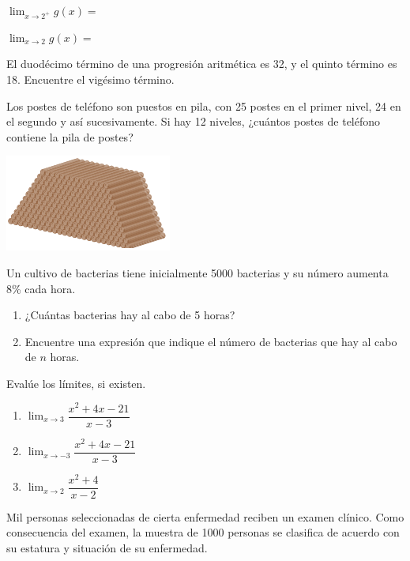 \documentclass[letterpaper,fleqn]{article}
\let\ds\displaystyle
\begin{document}
\begin{enumerate}
\begin{enumerate}
\begin{multicols}{2}
\item $\ds{\lim_{x\rightarrow 2^{+}}g(x)}=$
\item $\ds{\lim_{x\rightarrow 2}g(x)}=$
\end{multicols}
\end{enumerate}
\item El duodécimo término de una progresión aritmética es 32, y el quinto término es 18. Encuentre el vigésimo término.\noanswer
\begin{minipage}{.45\textwidth}
\item Los postes de teléfono son puestos en pila, con 25 postes en el primer nivel, 24 en el segundo y así sucesivamente. Si hay 12 niveles, ¿cuántos postes de teléfono contiene la pila de postes?
\end{minipage}\hfill
\begin{minipage}{.45\textwidth}
\includegraphics[scale=.9]{Images/postes.png} 
\end{minipage}
\noanswer
\item Un cultivo de bacterias tiene inicialmente 5000 bacterias y su número aumenta 8\% cada hora. 
\begin{enumerate}
\item ¿Cuántas bacterias hay al cabo de 5 horas?\noanswer
\item Encuentre una expresi\'{o}n que indique el n\'{u}mero de bacterias que hay al cabo de $n$ horas.\noanswer
\end{enumerate}
\item Evalúe los límites, si existen.
\begin{enumerate}
\item $\ds{\lim_{x\rightarrow 3}\dfrac{x^{2}+4x-21}{x-3}}$\noanswer
\item $\ds{\lim_{x\rightarrow -3}\dfrac{x^{2}+4x-21}{x-3}}$\noanswer
\item $\ds{\lim_{x\rightarrow 2}\dfrac{x^{2}+4}{x-2}}$\noanswer
\end{enumerate} 
\item Mil personas seleccionadas de cierta enfermedad reciben un examen clínico. Como consecuencia del examen, la muestra de 1000 personas se clasifica de acuerdo con su estatura y situaci\'{o}n de su enfermedad.

\end{enumerate}
\end{document}
